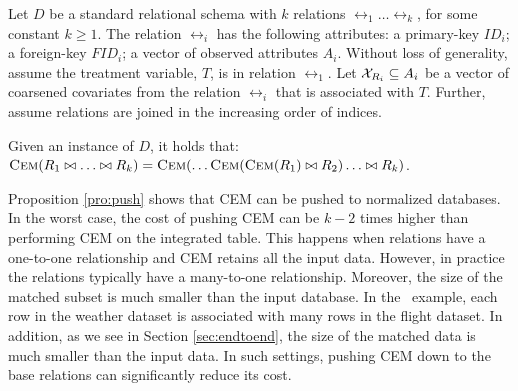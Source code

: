 Let $D$ be a standard relational schema with $k$ relations
$\rel_1 \ldots \rel_k$, for some constant $k \geq 1$. The relation $\rel_i$
has the following attributes:  a  primary-key $ID_i $;  a foreign-key $FID_i $;   a vector of observed attributes
 $A_i$.  Without loss of generality, assume the treatment variable, $T$, is in relation $\rel_1$.  Let
  ${{\mathcal{X}}}_{{{R}}_i} \subseteq {A}_i$ be a vector of coarsened covariates from the relation $\rel_i$ that is associated with $T$.
    Further, assume relations are joined in the increasing order of indices.


\vspace{-.2cm}
\begin{proposition} \label{pro:push}
Given an instance of $D$, it holds that: ${\textsc{Cem}}({{R}}_1  \bowtie
\ldots  \bowtie{{R}}_{k})= {\textsc{Cem}}( \ldots {\textsc{Cem}}({\textsc{Cem}}(R_1) \bowtie   R_2) \ldots  \bowtie R_{k}) $.
\end{proposition}

\vspace{-.2cm}
Proposition \ref{pro:push} shows that CEM can be pushed to normalized databases.  In the worst case, the cost of pushing CEM can be $k-2$ times higher than performing CEM
on the integrated table. This happens when relations have a one-to-one  relationship  and
CEM retains all the input data. However, in practice the relations typically have a  many-to-one
relationship. Moreover, the size of the matched subset is much smaller than the input database. In the \delay \ example,
each row in the weather dataset is associated with many rows in the flight dataset. In addition, as we see
in Section \ref{sec:endtoend}, the size of the matched data is much smaller than the input data. In such settings,
pushing CEM down to the base relations can significantly reduce its cost.



